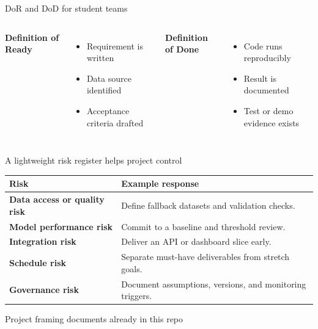 \begin{frame}{DoR and DoD for student teams}
\begin{columns}[T]
\textbf{Definition of Ready}
\begin{itemize}
\item Requirement is written
\item Data source identified
\item Acceptance criteria drafted
\end{itemize}
\textbf{Definition of Done}
\begin{itemize}
\item Code runs reproducibly
\item Result is documented
\item Test or demo evidence exists
\end{itemize}
\end{columns}
\coursefooter
\end{frame}

\begin{frame}{A lightweight risk register helps project control}
\begin{tabularx}{\textwidth}{>{\bfseries}l X}
Risk & Example response \\
\toprule
Data access or quality risk & Define fallback datasets and validation checks. \\
Model performance risk & Commit to a baseline and threshold review. \\
Integration risk & Deliver an API or dashboard slice early. \\
Schedule risk & Separate must-have deliverables from stretch goals. \\
Governance risk & Document assumptions, versions, and monitoring triggers. \\
\bottomrule
\end{tabularx}
\coursefooter
\end{frame}

\begin{frame}{Project framing documents already in this repo}
\coursefooter
\end{frame}

